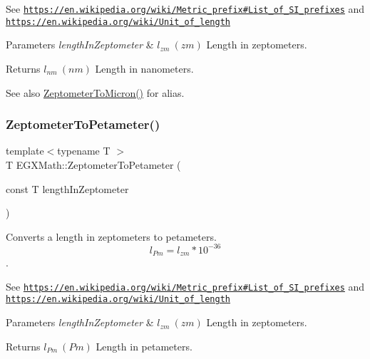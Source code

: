 See \href{https://en.wikipedia.org/wiki/Metric_prefix#List_of_SI_prefixes}{\tt https\+://en.\+wikipedia.\+org/wiki/\+Metric\+\_\+prefix\#\+List\+\_\+of\+\_\+\+S\+I\+\_\+prefixes} and \href{https://en.wikipedia.org/wiki/Unit_of_length}{\tt https\+://en.\+wikipedia.\+org/wiki/\+Unit\+\_\+of\+\_\+length} 
\begin{DoxyParams}{Parameters}
{\em length\+In\+Zeptometer} & $ l_{zm}\ (zm)$ Length in zeptometers. \\
\hline
\end{DoxyParams}
\begin{DoxyReturn}{Returns}
$ l_{nm}\ (nm)$ Length in nanometers. 
\end{DoxyReturn}
\begin{DoxySeeAlso}{See also}
\mbox{\hyperlink{group___e_g_x_math-_conversions-_length_conversions-_s_i-_zeptometer-_non-_s_i_ga0bd42e8489b135f27530a247193286da}{Zeptometer\+To\+Micron()}} for alias. 
\end{DoxySeeAlso}
\mbox{\label{group___e_g_x_math-_conversions-_length_conversions-_s_i-_zeptometer-_s_i_ga8d63077fa2d65649004804647da5af60}} 
\subsubsection{\texorpdfstring{Zeptometer\+To\+Petameter()}{ZeptometerToPetameter()}}
{\footnotesize\ttfamily template$<$typename T $>$ \\
T E\+G\+X\+Math\+::\+Zeptometer\+To\+Petameter (\begin{DoxyParamCaption}\item[{const T}]{length\+In\+Zeptometer }\end{DoxyParamCaption})}



Converts a length in zeptometers to petameters. \[ l_{Pm}=l_{zm} * 10^{-36} \]. 

See \href{https://en.wikipedia.org/wiki/Metric_prefix#List_of_SI_prefixes}{\tt https\+://en.\+wikipedia.\+org/wiki/\+Metric\+\_\+prefix\#\+List\+\_\+of\+\_\+\+S\+I\+\_\+prefixes} and \href{https://en.wikipedia.org/wiki/Unit_of_length}{\tt https\+://en.\+wikipedia.\+org/wiki/\+Unit\+\_\+of\+\_\+length} 
\begin{DoxyParams}{Parameters}
{\em length\+In\+Zeptometer} & $ l_{zm}\ (zm)$ Length in zeptometers. \\
\hline
\end{DoxyParams}
\begin{DoxyReturn}{Returns}
$ l_{Pm}\ (Pm)$ Length in petameters. 
\end{DoxyReturn}
\mbox{\label{group___e_g_x_math-_conversions-_length_conversions-_s_i-_zeptometer-_s_i_gae7409493227692a85b7fa5016a007de3}} 
